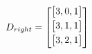 \documentclass{article}
\begin{document}
\begin{center}
\begin{minipage}{0.2\textwidth}
            $$D_{right} = 
        \begin{bmatrix}
        \vspace{1mm}
         \begin{bmatrix}
         3,0,1 \\
         \end{bmatrix} \\
        \vspace{1mm}
         \begin{bmatrix}
         3,1,1 \\
         \end{bmatrix} \\
        \vspace{1mm}
         \begin{bmatrix}
         3,2,1 \\
        \end{bmatrix} \\
         \end{bmatrix}
        $$
\end{minipage}\quad
\end{center}
\end{document}
